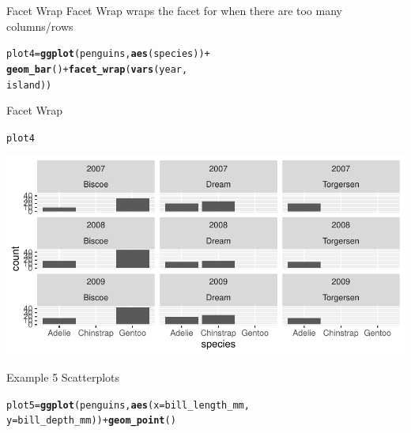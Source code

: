 \documentclass{beamer}\usepackage[]{graphicx}\usepackage[]{xcolor}
\makeatletter
\newcommand{\hlopt}[1]{\textcolor[rgb]{0,0,0}{#1}}%
\newcommand{\hlstd}[1]{\textcolor[rgb]{0.345,0.345,0.345}{#1}}%
\newcommand{\hlkwb}[1]{\textcolor[rgb]{0.69,0.353,0.396}{#1}}%
\newcommand{\hlkwc}[1]{\textcolor[rgb]{0.333,0.667,0.333}{#1}}%
\newcommand{\hlkwd}[1]{\textcolor[rgb]{0.737,0.353,0.396}{\textbf{#1}}}%
\newenvironment{kframe}{%
 \def\at@end@of@kframe{}%
 \ifinner\ifhmode%
  \def\at@end@of@kframe{\end{minipage}}%
  \begin{minipage}{\columnwidth}%
 \fi\fi%
 \def\FrameCommand##1{\hskip\@totalleftmargin \hskip-\fboxsep
 \colorbox{shadecolor}{##1}\hskip-\fboxsep
     \hskip-\linewidth \hskip-\@totalleftmargin \hskip\columnwidth}%
 \MakeFramed {\advance\hsize-\width
   \@totalleftmargin\z@ \linewidth\hsize
   \@setminipage}}%
 {\par\unskip\endMakeFramed%
 \at@end@of@kframe}
\newenvironment{knitrout}{}{} %
\makeatother
\begin{document}
\begin{frame}[fragile]{Facet Wrap}
Facet Wrap wraps the facet for when there are too many columns/rows
\begin{knitrout}
\color{fgcolor}\begin{kframe}
\begin{alltt}
\hlstd{plot4} \hlkwb{=} \hlkwd{ggplot}\hlstd{(penguins,} \hlkwd{aes}\hlstd{(species))} \hlopt{+}
    \hlkwd{geom_bar}\hlstd{()} \hlopt{+} \hlkwd{facet_wrap}\hlstd{(}\hlkwd{vars}\hlstd{(year,}
    \hlstd{island))}
\end{alltt}
\end{kframe}
\end{knitrout}

\end{frame}

\begin{frame}[fragile]{Facet Wrap}
\begin{knitrout}
\color{fgcolor}\begin{kframe}
\begin{alltt}
\hlstd{plot4}
\end{alltt}
\end{kframe}
\includegraphics[width=0.95\linewidth]{figure/unnamed-chunk-25-1} 
\end{knitrout}

\end{frame}

\begin{frame}[fragile]{Example 5 Scatterplots}
\begin{knitrout}
\color{fgcolor}\begin{kframe}
\begin{alltt}
\hlstd{plot5} \hlkwb{=} \hlkwd{ggplot}\hlstd{(penguins,} \hlkwd{aes}\hlstd{(}\hlkwc{x} \hlstd{= bill_length_mm,}
    \hlkwc{y} \hlstd{= bill_depth_mm))} \hlopt{+} \hlkwd{geom_point}\hlstd{()}
\end{alltt}
\end{kframe}
\end{knitrout}

\end{frame}
\end{document}
